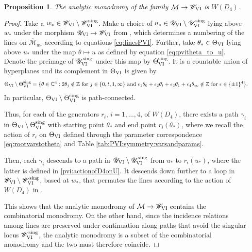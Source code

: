 \documentclass[a4paper,reqno]{amsart}
\numberwithin{equation}{section}
\newtheorem{proposition}[theorem]{Proposition}
\numberwithin{equation}{section}
\begin{document}
\begin{proposition} \label{prop:analyticmonodromyPVI}
    The analytic monodromy of the family $\mathcal{M}\to \mathscr{W}_{\rm{VI}}$ is $W(D_4)$.
\end{proposition}
\begin{proof}
    Take a $w_* \in \mathscr{W}_{\rm{VI}}\setminus \mathscr{W}_{\rm{VI}}^{\operatorname{sing}}$.
    Make a choice of $u_*\in \mathscr{U}_{\rm{VI}}\setminus \mathscr{U}_{\rm{VI}}^{\operatorname{sing}}$ lying above $w_*$ under the morphism $\mathscr{U}_{\rm{VI}}\to \mathscr{W}_{\rm{VI}}$ from , which determines a numbering of the lines on $\overline{\mathcal{M}}_{w_*}$ according to equations \eqref{eq:linesPVI}.
    Further, take $\theta_* \in \Theta_{\rm{VI}}$ lying above $u_*$ under the map $\theta \mapsto u$ as defined by equation \eqref{eq:pvitheta_to_u}.
    Denote the preimage of $\mathscr{U}_{\rm{VI}}^{\operatorname{sing}}$ under this map by $\Theta_{\rm{VI}}^{\operatorname{sing}}$. It is a countable union of hyperplanes and its complement in $\Theta_{\rm{VI}}$ is given by
    \begin{equation*}
        \Theta_{\rm{VI}}\setminus \Theta_{\rm{VI}}^{\operatorname{sing}}=\{\theta\in \mathbb{C}^4:2\theta_j\notin\mathbb{Z}\text{ for $j\in \{0,t,1,\infty\}$ and }
\epsilon_1\theta_0+\epsilon_2\theta_t+\epsilon_3\theta_1+\epsilon_4\theta_\infty\notin\mathbb{Z}\text{ for $\epsilon\in \{\pm 1\}^4$}\}.
    \end{equation*}
In particular, $\Theta_{\rm{VI}}\setminus \Theta_{\rm{VI}}^{\operatorname{sing}}$ is path-connected.
    
    Thus, for each of the generators $r_i$, $i=1,\dots,4$, of $W(D_4)$, there exists a path $\gamma_i$ in $\Theta_{\rm{VI}}\setminus \Theta_{\rm{VI}}^{\operatorname{sing}}$ with starting point $\theta_*$ and end point $r_i(\theta_*)$, where we recall the action of $r_i$ on $\Theta_{\rm{VI}}$ defined through the parameter correspondence \eqref{eq:rootvarstotheta} and Table \ref{tab:PVI:symmetry:varsandparams}.
    
    Then, each $\gamma_i$ descends to a path in $\mathscr{U}_{\rm{VI}}\setminus \mathscr{U}_{\rm{VI}}^{\operatorname{sing}}$ from $u_*$ to $r_i(u_*)$, where the latter is defined in \eqref{pvi:actionofD4onU}.
    It descends down further to a loop in $\mathscr{W}_{\rm{VI}}\setminus\mathscr{W}_{\rm{VI}}^{\operatorname{sing}}$, based at $w_*$, that permutes the lines according to the action of $W(D_4)$ in .

    This shows that the analytic monodromy of $\mathcal{M}\to \mathscr{W}_{\rm{VI}}$ contains the combinatorial monodromy. On the other hand, since the incidence relations among lines are preserved under continuation along paths that avoid the singular locus $\mathscr{W}_{\rm{VI}}^{\operatorname{sing}}$, the analytic monodromy is a subset of the combinatorial monodromy and the two must therefore coincide.
\end{proof}
\end{document}
